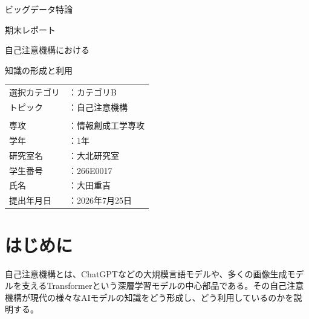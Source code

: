 \documentclass[10pt,a4paper]{jarticle}
\begin{document}
\begin{titlepage}
  \thispagestyle{empty}

  \begin{center}
    {\Large ビッグデータ特論\par}
    \vspace{0.4em}
    {\Large 期末レポート\par}

    \vspace{2.5em}

    {\fontsize{28pt}{42pt}\selectfont
      自己注意機構における\par
      \vspace{0.5em}
      知識の形成と利用\par
    }
  \end{center}

  \vfill

  \begin{flushright}
    \begin{minipage}{0.43\textwidth}
      \renewcommand{\arraystretch}{1.35}
      \begin{tabular}{@{}ll@{}}
        選択カテゴリ &：カテゴリB \\
        トピック     &：自己注意機構 \\
                     & \\
        専攻         &：情報創成工学専攻 \\
        学年         &：1年 \\
        研究室名     &：大北研究室 \\
        学生番号     &：266E0017 \\
        氏名         &：大田重吉 \\
        提出年月日   &：2026年7月25日
      \end{tabular}
    \end{minipage}
  \end{flushright}

\end{titlepage}


\section{はじめに}
自己注意機構とは、ChatGPTなどの大規模言語モデルや、多くの画像生成モデルを支えるTransformerという深層学習モデルの中心部品である。その自己注意機構が現代の様々なAIモデルの知識をどう形成し、どう利用しているのかを説明する。
\end{document}
